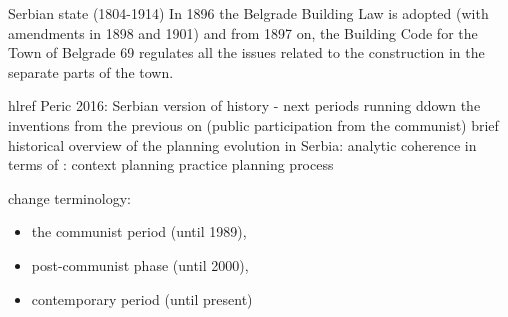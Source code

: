 \documentclass[11pt]{report}
\begin{document}
Serbian state (1804-1914)
In 1896 the Belgrade Building Law is adopted (with amendments in 1898 and 1901) and from 1897 on, the Building Code for the Town of Belgrade 69  regulates all the issues related to the construction in the separate parts of the town. 

hl{ref Peric 2016}:
Serbian version of history - next periods running ddown the inventions from the previous on (public participation from the communist)
brief historical overview of the planning evolution in Serbia:
analytic coherence in terms of :
    context
    planning practice
    planning process
    
change terminology:
\begin{itemize}
\item     the communist period (until 1989),
\item     post-communist phase (until 2000),
\item    contemporary period (until present)
\end{itemize}
\end{document}
